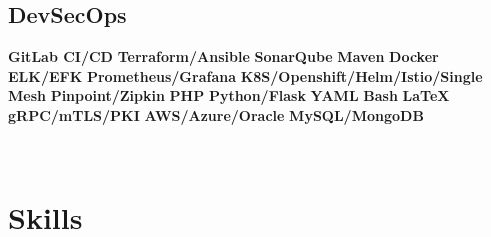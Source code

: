 \documentclass[]{friggeri-cv}
\begin{document}
\begin{aside}
  \section{DevSecOps}
    \textbf{GitLab CI/CD}
    \textbf{Terraform/Ansible}
    \textbf{SonarQube}
    \textbf{Maven}
    \textbf{Docker}
    \textbf{ELK/EFK}
    \textbf{Prometheus/Grafana}
    \textbf{K8S/Openshift/Helm/Istio/Single Mesh}
    \textbf{Pinpoint/Zipkin}
    \textbf{PHP}
    \textbf{Python/Flask}
    \textbf{YAML}
    \textbf{Bash}
    \textbf{LaTeX}
    \textbf{gRPC/mTLS/PKI}
    \textbf{AWS/Azure/Oracle}
    \textbf{MySQL/MongoDB}
    ~
\end{aside}
~

\section{Skills}
\end{document}

